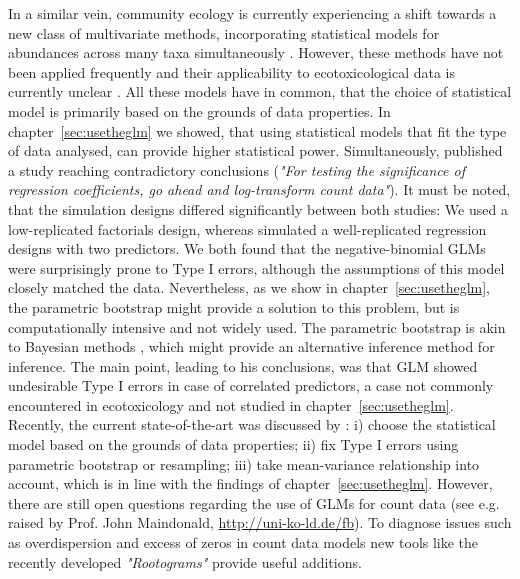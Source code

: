 In a similar vein, community ecology is currently experiencing a shift towards a new class of multivariate methods, incorporating statistical models for abundances across many taxa simultaneously \citep{warton_model-based_2015, warton_distance-based_2012, warton_so_2015, ter_braak_topics_2014}.
However, these methods have not been applied frequently and their applicability to ecotoxicological data is currently unclear \citep{szocs_analysing_2015}. 
All these models have in common, that the choice of statistical model is primarily based on the grounds of data properties. 
In chapter~\ref{sec:usetheglm} we showed, that using statistical models that fit the type of data analysed, can provide higher statistical power.
Simultaneously, \citet{ives_for_2015} published a study reaching contradictory conclusions (\emph{"For testing the significance of regression coefficients, go ahead and log-transform count data"}). 
It must be noted, that the simulation designs differed significantly between both studies: We used a low-replicated factorials design, whereas \citet{ives_for_2015} simulated a well-replicated regression designs with two predictors.
We both found that the negative-binomial GLMs were surprisingly prone to Type I errors, although the assumptions of this model closely matched the data.
Nevertheless, as we show in chapter~\ref{sec:usetheglm}, the parametric bootstrap might provide a solution to this problem, but is computationally intensive and not widely used.
The parametric bootstrap is akin to Bayesian methods \citep{gelman_bayesian_2014}, which might provide an alternative inference method for inference.
The main point, leading \citet{ives_for_2015} to his conclusions, was that GLM showed undesirable Type I errors in case of correlated predictors, a case not commonly encountered in ecotoxicology and not studied in chapter~\ref{sec:usetheglm}.
Recently, the current state-of-the-art was discussed by \citet{warton_three_2016}: i) choose the statistical model based on the grounds of data properties; ii) fix Type I errors using parametric bootstrap or resampling; iii) take mean-variance relationship into account, which is in line with the findings of chapter~\ref{sec:usetheglm}.
However, there are still open questions regarding the use of GLMs for count data (see e.g. raised by Prof. John Maindonald, \url{http://uni-ko-ld.de/fb}).
To diagnose issues such as overdispersion and excess of zeros in count data models new tools like the recently developed \emph{"Rootograms"} \citep{kleiber_visualizing_2016} provide useful additions.

